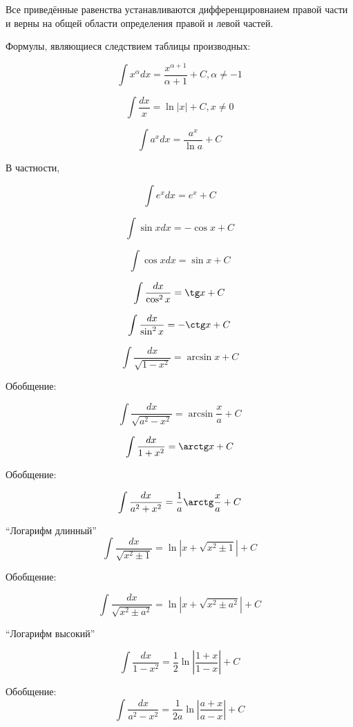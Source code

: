 Все приведённые равенства устанавливаются дифференцировнаием правой части и верны на общей области определения правой и левой частей.

Формулы, являющиеся следствием таблицы производных:

\begin{list}{.}{}

\item
$$
\int x^\alpha dx= \frac{x^{\alpha+1}}{\alpha+1}+C, \alpha \neq -1
$$

\item
$$
\int \frac{dx}{x}= \ln|x|+C, x\neq 0
$$

\item
$$
\int a^x dx= \frac{a^x}{\ln a}+C
$$

В частности,

$$
\int e^x dx= e^x +C
$$

\item
$$
\int \sin x dx= -\cos x+C
$$

\item
$$
\int \cos x dx= \sin x+C
$$

\item
$$
\int \frac{dx}{\cos^2 x}= \tg x +C
$$

\item
$$
\int \frac{dx}{\sin^2 x}= -\ctg x +C
$$

\item
$$
\int \frac{dx}{\sqrt{1-x^2}}= \arcsin x+C
$$

Обобщение:

$$
\int \frac{dx}{\sqrt{a^2-x^2}}= \arcsin \frac{x}{a}+C
$$

\item
$$
\int \frac{dx}{1+x^2}= \arctg x+C
$$

Обобщение:

$$
\int \frac{dx}{a^2+x^2}= \frac{1}{a} \arctg \frac{x}{a}+C
$$


\item

``Логарифм длинный''
$$
\int \frac{dx}{\sqrt{x^2 \pm 1}}= \ln|x+\sqrt{x^2 \pm 1}|+C
$$

Обобщение:

$$
\int \frac{dx}{\sqrt{x^2 \pm a^2}}= \ln|x+\sqrt{x^2 \pm a^2}|+C
$$

\item

``Логарифм высокий''

$$
\int \frac{dx}{1-x^2}= \frac{1}{2} \ln \left| \frac{1+x}{1-x}\right|+C
$$

Обобщение:
$$
\int \frac{dx}{a^2-x^2}= \frac{1}{2a} \ln \left| \frac{a+x}{a-x}\right|+C
$$

\end{list}

